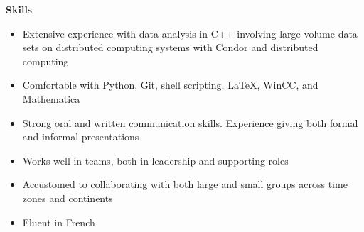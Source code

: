 \documentclass[line]{letter}
\begin{document}


{\vspace{10pt}\Large \bf Skills\vspace{-12pt}\\}
\begin{itemize}[leftmargin=*]
\item Extensive experience with data analysis in C++ involving large volume data sets on distributed computing
systems with Condor and distributed computing%

\item Comfortable with Python, Git, shell scripting, \LaTeX, WinCC, and Mathematica%

\item Strong oral and written communication skills. Experience giving both formal and informal presentations%

\item Works well in teams, both in leadership and supporting roles

\item Accustomed to collaborating with both large and
small groups across time zones and continents%

\item Fluent in French
\end{itemize}

\end{document}
